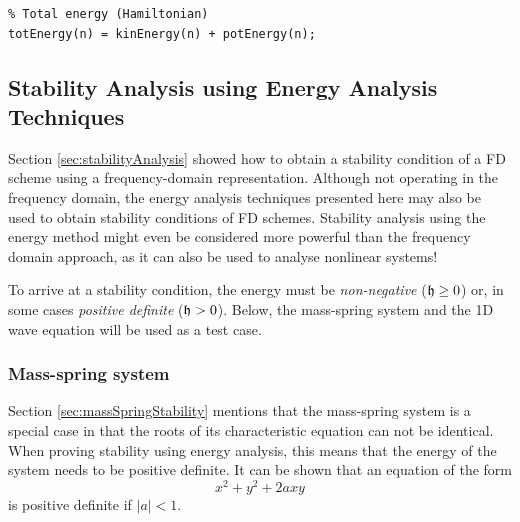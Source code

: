 {{\begin{lstlisting}
% Total energy (Hamiltonian)
totEnergy(n) = kinEnergy(n) + potEnergy(n);
\end{lstlisting}


\subsection{Stability Analysis using Energy Analysis Techniques}\label{sec:stabilityAnalysisEnergy}
Section \ref{sec:stabilityAnalysis} showed how to obtain a stability condition of a FD scheme using a frequency-domain representation. Although not operating in the frequency domain, the energy analysis techniques presented here may also be used to obtain stability conditions of FD schemes. Stability analysis using the energy method might even be considered more powerful than the frequency domain approach, as it can also be used to analyse nonlinear systems!

To arrive at a stability condition, the energy must be \textit{non-negative} ($\mathfrak{h} \geq 0$) or, in some cases \textit{positive definite} ($\mathfrak{h} > 0$). Below, the mass-spring system and the 1D wave equation will be used as a test case.

\subsubsection{Mass-spring system}
Section \ref{sec:massSpringStability} mentions that the mass-spring system is a special case in that the roots of its characteristic equation can not be identical. When proving stability using energy analysis, this means that the energy of the system needs to be positive definite. It can be shown that an equation of the form 
\begin{equation}\label{eq:quadraticForm}
    x^2 + y^2  + 2axy
\end{equation} 
is positive definite if $|a| < 1$.%

}}
